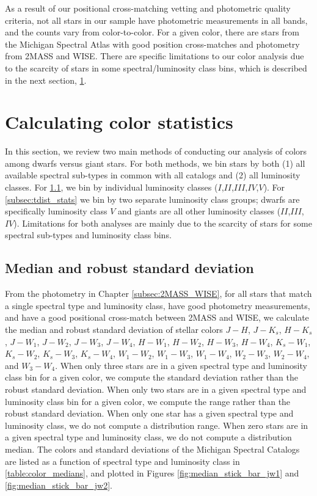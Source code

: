 As a result of our positional cross-matching vetting and photometric quality criteria, not all stars in our sample have photometric measurements in all bands, and the counts vary from color-to-color. For a given color, there are \bincount stars from the Michigan Spectral Atlas with good position cross-matches and photometry from 2MASS and WISE. There are specific limitations to our color analysis due to the scarcity of stars in some spectral/luminosity class bins, which is described in the next section, \ref{sec:color_stats}.

\section{Calculating color statistics} \label{sec:color_stats}
In this section, we review two main methods of conducting our analysis of colors among dwarfs versus giant stars. For both methods, we bin stars by both (1) all available spectral sub-types in common with all catalogs and (2) all luminosity classes. For \ref{subsec:median_stats}, we bin by individual luminosity classes ($I$,$II$,$III$,$IV$,$V$). For \ref{subsec:tdist_stats} we bin by two separate luminosity class groups; dwarfs are specifically luminosity class $V$ and giants are all other luminosity classes ($II$,$III$,$IV$). Limitations for both analyses are mainly due to the scarcity of stars for some spectral sub-types and luminosity class bins. 

\subsection{Median and robust standard deviation} \label{subsec:median_stats}
From the photometry in Chapter \ref{subsec:2MASS_WISE}, for all stars that match a single spectral type and luminosity class, have good photometry measurements, and have a good positional cross-match between 2MASS and WISE, we calculate the median and robust standard deviation of stellar colors $J-H$, $J-K_{s}$, $H-K_{s}$, $J-W_{1}$, $J-W_{2}$, $J-W_{3}$, $J-W_{4}$, $H-W_{1}$, $H-W_{2}$, $H-W_{3}$, $H-W_{4}$, $K_{s}-W_{1}$, $K_{s}-W_{2}$, $K_{s}-W_{3}$, $K_{s}-W_{4}$, $W_{1}-W_{2}$, $W_{1}-W_{3}$, $W_{1}-W_{4}$, $W_{2}-W_{3}$, $W_{2}-W_{4}$, and $W_{3}-W_{4}$.  When only three stars are in a given spectral type and luminosity class bin for a given color, we compute the standard deviation rather than the robust standard deviation.  When only two stars are in a given spectral type and luminosity class bin for a given color, we compute the range rather than the robust standard deviation.  When only one star has a given spectral type and luminosity class, we do not compute a distribution range.  When zero stars are in a given spectral type and luminosity class, we do not compute a distribution median.  The colors and standard deviations of the Michigan Spectral Catalogs are listed as a function of spectral type and luminosity class in \ref{table:color_medians}, and plotted in Figures \ref{fig:median_stick_bar_jw1} and \ref{fig:median_stick_bar_jw2}.

